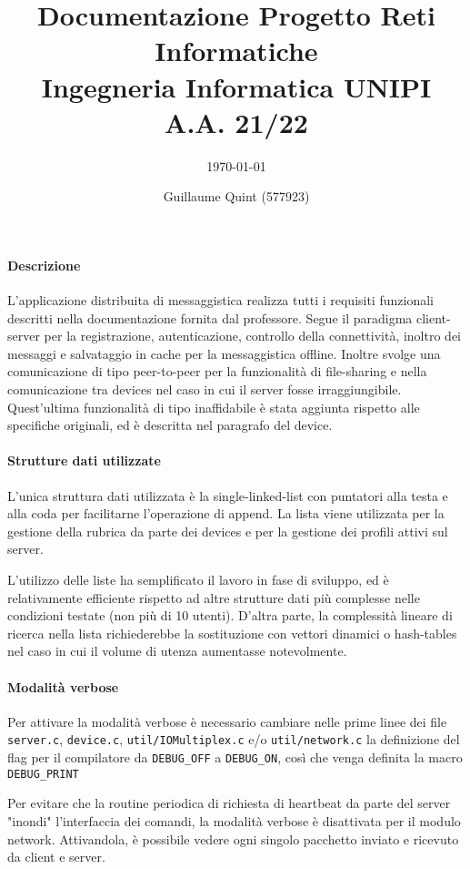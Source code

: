 \documentclass[11pt,a4paper,twocolumn,twoside]{paper}
\author{Guillaume Quint (577923)}
\title{\vspace{-4em}Documentazione Progetto Reti Informatiche\\Ingegneria Informatica UNIPI A.A. 21/22}
\subtitle{\today}
\begin{document}
\maketitle

\paragraph{Descrizione}
	L'applicazione distribuita di messaggistica realizza tutti i
    requisiti funzionali descritti nella documentazione fornita dal
    professore. Segue il paradigma client-server per la registrazione,
    autenticazione, controllo della connettività, inoltro dei messaggi e
    salvataggio in cache per la messaggistica offline. Inoltre svolge
    una comunicazione di tipo peer-to-peer per la funzionalità di
    file-sharing e nella comunicazione tra devices nel caso in cui il
    server fosse irraggiungibile. Quest'ultima funzionalità di tipo
    inaffidabile è stata aggiunta rispetto alle specifiche originali, ed
    è descritta nel paragrafo del device.
\paragraph{Strutture dati utilizzate}
	L'unica struttura dati utilizzata è la single-linked-list con
    puntatori alla testa e alla coda per facilitarne l'operazione di
    append. La lista viene utilizzata per la gestione della rubrica da
    parte dei devices e per la gestione dei profili attivi sul server.

    L'utilizzo delle liste ha semplificato il lavoro in fase di
    sviluppo, ed è relativamente efficiente rispetto ad altre strutture
    dati più complesse nelle condizioni testate (non più di 10 utenti).
    D'altra parte, la complessità lineare di ricerca nella lista
    richiederebbe la sostituzione con vettori dinamici o hash-tables nel
    caso in cui il volume di utenza aumentasse notevolmente.
\paragraph{Modalità verbose}
    Per attivare la modalità verbose è necessario cambiare nelle prime
    linee dei file \texttt{server.c}, \texttt{device.c},
    \texttt{util/IOMultiplex.c} e/o \texttt{util/network.c} la
    definizione del flag per il compilatore da \texttt{DEBUG\_OFF} a
    \texttt{DEBUG\_ON}, così che venga definita la macro
    \texttt{DEBUG\_PRINT}

    Per evitare che la routine periodica di richiesta di heartbeat da
    parte del server "inondi" l'interfaccia dei comandi, la modalità
    verbose è disattivata per il modulo network. Attivandola, è
    possibile vedere ogni singolo pacchetto inviato e ricevuto da client
    e server.
\end{document}
